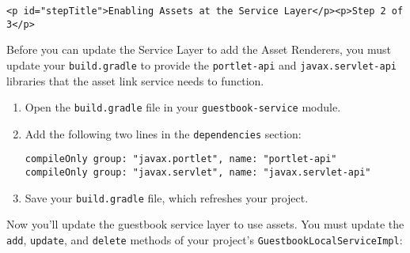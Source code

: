 \begin{verbatim}
<p id="stepTitle">Enabling Assets at the Service Layer</p><p>Step 2 of 3</p>
\end{verbatim}

Before you can update the Service Layer to add the Asset Renderers, you
must update your \texttt{build.gradle} to provide the
\texttt{portlet-api} and \texttt{javax.servlet-api} libraries that the
asset link service needs to function.

\begin{enumerate}
\def\labelenumi{\arabic{enumi}.}
\item
  Open the \texttt{build.gradle} file in your \texttt{guestbook-service}
  module.
\item
  Add the following two lines in the \texttt{dependencies} section:

\begin{verbatim}
compileOnly group: "javax.portlet", name: "portlet-api"
compileOnly group: "javax.servlet", name: "javax.servlet-api"
\end{verbatim}
\item
  Save your \texttt{build.gradle} file, which refreshes your project.
\end{enumerate}

Now you'll update the guestbook service layer to use assets. You must
update the \texttt{add}, \texttt{update}, and \texttt{delete} methods of
your project's \texttt{GuestbookLocalServiceImpl}:

